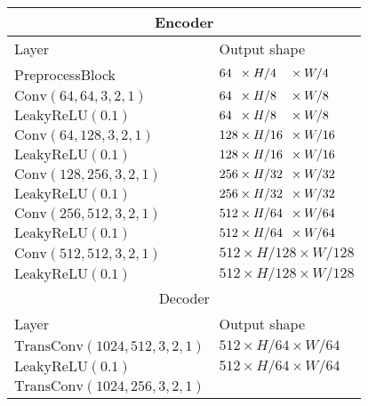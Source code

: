 \documentclass[final]{cvpr}
\begin{document}
\begin{table}[ht]
    \setlength{\tabcolsep}{3pt}
    \centering
    \begin{tabular}{l|l}
        \toprule
        \multicolumn{2}{c}{Encoder}\\
        \midrule
        Layer                                        &  Output shape\\
        \midrule
        PreprocessBlock & $64\hphantom{0} \times H/4\hphantom{00} \times W/4\hphantom{00}$\\
        $\text{Conv}(64, 64, 3, 2, 1)$               &  
        $64\hphantom{0} \times H/8\hphantom{00} \times W/8$\\
        $\text{LeakyReLU}(0.1)$                      &  
        $64\hphantom{0} \times H/8\hphantom{00} \times W/8$\\
        $\text{Conv}(64, 128, 3, 2, 1)$              &  
        $128 \times H/16\hphantom{0} \times W/16$\\
        $\text{LeakyReLU}(0.1)$                      &  
        $128 \times H/16\hphantom{0} \times W/16$\\
        $\text{Conv}(128, 256, 3, 2, 1)$             &  
        $256 \times H/32\hphantom{0} \times W/32$\\
        $\text{LeakyReLU}(0.1)$                      &  
        $256 \times H/32\hphantom{0} \times W/32$\\
        $\text{Conv}(256, 512, 3, 2, 1)$             &  
        $512 \times H/64\hphantom{0} \times W/64$\\
        $\text{LeakyReLU}(0.1)$                      &  
        $512 \times H/64\hphantom{0} \times W/64$\\
        $\text{Conv}(512, 512, 3, 2, 1)$             &  
        $512 \times H/128 \times W/128$\\
        $\text{LeakyReLU}(0.1)$                      &  
        $512 \times H/128 \times W/128$\\
        \midrule
        \multicolumn{2}{c}{Decoder}\\
        \midrule
        Layer                                        &  Output shape\\
        \midrule
        $\text{TransConv}(1024, 512, 3, 2, 1)$       &  
        $512 \times H/64 \times W/64$\\
        $\text{LeakyReLU}(0.1)$                      &  
        $512 \times H/64 \times W/64$\\
        $\text{TransConv}(1024, 256, 3, 2, 1)$       &  

\end{tabular}
\end{table}
\end{document}
